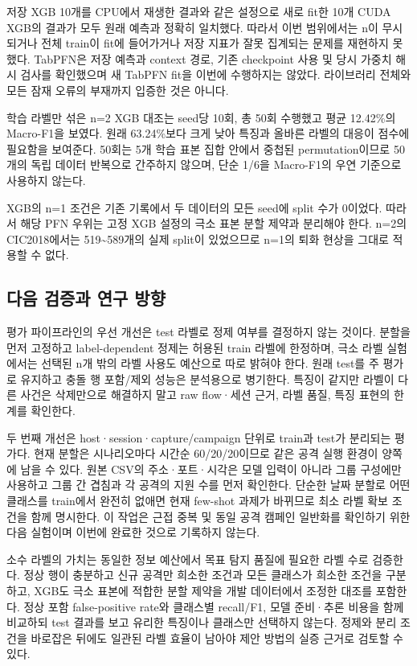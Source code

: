 저장 XGB 10개를 CPU에서 재생한 결과와 같은 설정으로 새로 fit한 10개 CUDA XGB의 결과가 모두 원래 예측과 정확히 일치했다. 따라서 이번 범위에서는 n이 무시되거나 전체 train이 fit에 들어가거나 저장 지표가 잘못 집계되는 문제를 재현하지 못했다. TabPFN은 저장 예측과 context 경로, 기존 checkpoint 사용 및 당시 가중치 해시 검사를 확인했으며 새 TabPFN fit을 이번에 수행하지는 않았다. 라이브러리 전체와 모든 잠재 오류의 부재까지 입증한 것은 아니다.

학습 라벨만 섞은 n=\allowbreak{}2 XGB 대조는 seed당 10회, 총 50회 수행했고 평균 12.42\%의 Macro-F1을 보였다. 원래 63.24\%보다 크게 낮아 특징과 올바른 라벨의 대응이 점수에 필요함을 보여준다. 50회는 5개 학습 표본 집합 안에서 중첩된 permutation이므로 50개의 독립 데이터 반복으로 간주하지 않으며, 단순 1/\allowbreak{}6을 Macro-F1의 우연 기준으로 사용하지 않는다.

XGB의 n=\allowbreak{}1 조건은 기존 기록에서 두 데이터의 모든 seed에 split 수가 0이었다. 따라서 해당 PFN 우위는 고정 XGB 설정의 극소 표본 분할 제약과 분리해야 한다. n=\allowbreak{}2의 CIC2018에서는 519\textasciitilde{}589개의 실제 split이 있었으므로 n=\allowbreak{}1의 퇴화 현상을 그대로 적용할 수 없다.

\subsection{다음 검증과 연구 방향}
평가 파이프라인의 우선 개선은 test 라벨로 정제 여부를 결정하지 않는 것이다. 분할을 먼저 고정하고 label-dependent 정제는 허용된 train 라벨에 한정하며, 극소 라벨 실험에서는 선택된 n개 밖의 라벨 사용도 예산으로 따로 밝혀야 한다. 원래 test를 주 평가로 유지하고 충돌 행 포함/\allowbreak{}제외 성능은 분석용으로 병기한다. 특징이 같지만 라벨이 다른 사건은 삭제만으로 해결하지 말고 raw flow·세션 근거, 라벨 품질, 특징 표현의 한계를 확인한다.

두 번째 개선은 host·session·capture/\allowbreak{}campaign 단위로 train과 test가 분리되는 평가다. 현재 분할은 시나리오마다 시간순 60/\allowbreak{}20/\allowbreak{}20이므로 같은 공격 실행 환경이 양쪽에 남을 수 있다. 원본 CSV의 주소·포트·시각은 모델 입력이 아니라 그룹 구성에만 사용하고 그룹 간 겹침과 각 공격의 지원 수를 먼저 확인한다. 단순한 날짜 분할로 어떤 클래스를 train에서 완전히 없애면 현재 few-shot 과제가 바뀌므로 최소 라벨 확보 조건을 함께 명시한다. 이 작업은 근접 중복 및 동일 공격 캠페인 일반화를 확인하기 위한 다음 실험이며 이번에 완료한 것으로 기록하지 않는다.

소수 라벨의 가치는 동일한 정보 예산에서 목표 탐지 품질에 필요한 라벨 수로 검증한다. 정상 행이 충분하고 신규 공격만 희소한 조건과 모든 클래스가 희소한 조건을 구분하고, XGB도 극소 표본에 적합한 분할 제약을 개발 데이터에서 조정한 대조를 포함한다. 정상 포함 false-positive rate와 클래스별 recall/\allowbreak{}F1, 모델 준비·추론 비용을 함께 비교하되 test 결과를 보고 유리한 특징이나 클래스만 선택하지 않는다. 정제와 분리 조건을 바로잡은 뒤에도 일관된 라벨 효율이 남아야 제안 방법의 실증 근거로 검토할 수 있다.

